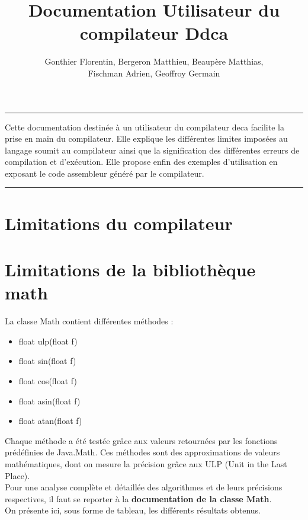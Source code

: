 \documentclass[a4,12pt]{article}
\begin{document}
\begin{titlepage}
\title{ Documentation Utilisateur du compilateur Ddca}
\author{Gonthier Florentin, Bergeron Matthieu, Beaupère Matthias,\\ Fischman Adrien, Geoffroy Germain}
\date{}

\maketitle

\rule[0.5ex]{\textwidth}{0.2mm}
Cette documentation destinée à un utilisateur du compilateur deca facilite la prise en main du compilateur.
Elle explique les différentes limites imposées au langage soumit au compilateur ainsi que la signification des
différentes erreurs de compilation et d'exécution. Elle propose enfin des exemples d'utilisation en exposant
le code assembleur généré par le compilateur.

\rule[0.5ex]{\textwidth}{0.2mm}

\end{titlepage}
\tableofcontents
\newpage

\section{Limitations du compilateur}

\section{Limitations de la bibliothèque math}
La classe Math contient différentes méthodes :
\begin{itemize}
    \item float ulp(float f)
    \item float sin(float f)
    \item float cos(float f)
    \item float asin(float f)
    \item float atan(float f)
\end{itemize}
Chaque méthode a été testée grâce aux valeurs retournées par les fonctions prédéfinies de Java.Math. Ces méthodes sont des approximations de valeurs mathématiques, dont on mesure la précision grâce aux ULP (Unit in the Last Place).\\
Pour une analyse complète et détaillée des algorithmes et de leurs précisions respectives, il faut se reporter à la \textbf{documentation de la classe Math}. \\
On présente ici, sous forme de tableau, les différents résultats obtenus.
\end{document}
